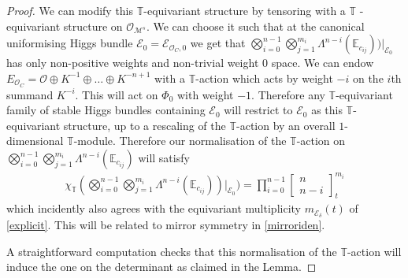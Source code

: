 \documentclass[12pt]{article}
\numberwithin{equation}{section}
\theoremstyle{remark}
\theoremstyle{definition}
\numberwithin{theorem}{section}
\def\beq{\begin{eqnarray}}
\def\eeq{\end{eqnarray}}
\def\calE{{\mathcal E}}
\def\bE{{\mathbb{E}}}
\def\M{{\mathcal{M}}}
\newcommand{\T}{{\mathbb{T}}}
\def\calO{{\mathcal O}}
\def\d{{{\delta}}}
\renewcommand{\1}{\mathbbm{1}}
\begin{document}
\begin{proof}
	We can modify this $\T$-equivariant structure by tensoring with a $\T$ -equivariant  structure on $\calO_{\M^s}$. We can choose it  such that at the canonical uniformising  Higgs bundle $\calE_0=\calE_{\calO_C,0}$  we get that
	$\bigotimes_{i=0}^{n-1}\bigotimes_{j=1}^{m_i} \Lambda^{n-i}(\bE_{c_{ij}}))|_{\calE_0}$ has only non-positive weights and non-trivial weight $0$ space. We can endow $E_{\calO_C}=\calO\oplus K^{-1}\oplus \dots \oplus K^{-n+1}$ with a $\T$-action which acts by weight $-i$ on the $i$th summand $K^{-i}$. This will act on $\Phi_{0}$ with weight $-1$. Therefore any $\T$-equivariant family of stable Higgs bundles containing $\calE_0$ will restrict to $\calE_0$ as this $\T$-equivariant structure, up to a rescaling of the $\T$-action by an overall $1$-dimensional $\T$-module. Therefore  our normalisation of the $\T$-action on  $\bigotimes_{i=0}^{n-1}\bigotimes_{j=1}^{m_i} \Lambda^{n-i}(\bE_{c_{ij}})$  will satisfy \beq\label{eqmultuniv}\chi_\T(\bigotimes_{i=0}^{n-1}\bigotimes_{j=1}^{m_i} \Lambda^{n-i}(\bE_{c_{ij}}))|_{\calE_0})=\prod_{i=0}^{n-1} \left[\begin{array}{c} n \\ n-i\end{array}\right]^{m_i}_t\eeq which incidently also agrees with the equivariant multiplicity $m_{\calE_{\d}}(t)$ of \eqref{explicit}. This will be related to  mirror symmetry in \eqref{mirroriden}. 
	
	A straightforward computation checks that this normalisation of the $\T$-action will induce the one on the determinant as claimed in the Lemma. 
\end{proof}
\end{document}
